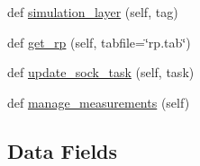 \begin{DoxyCompactItemize}
\item 
def \mbox{\hyperlink{classapplication_1_1_application_a3b37792e871ae0aff20a7fc504b29458}{simulation\+\_\+layer}} (self, tag)
\item 
def \mbox{\hyperlink{classapplication_1_1_application_afded811885b0390450238ee8487d992a}{get\+\_\+rp}} (self, tabfile=\char`\"{}rp.\+tab\char`\"{})
\item 
def \mbox{\hyperlink{classapplication_1_1_application_aabeebafd4c55db0de5b62920f912b428}{update\+\_\+sock\+\_\+task}} (self, task)
\item 
def \mbox{\hyperlink{classapplication_1_1_application_aadd900346b1bd5c962657a1566f9fbb7}{manage\+\_\+measurements}} (self)
\end{DoxyCompactItemize}
\subsection*{Data Fields}
